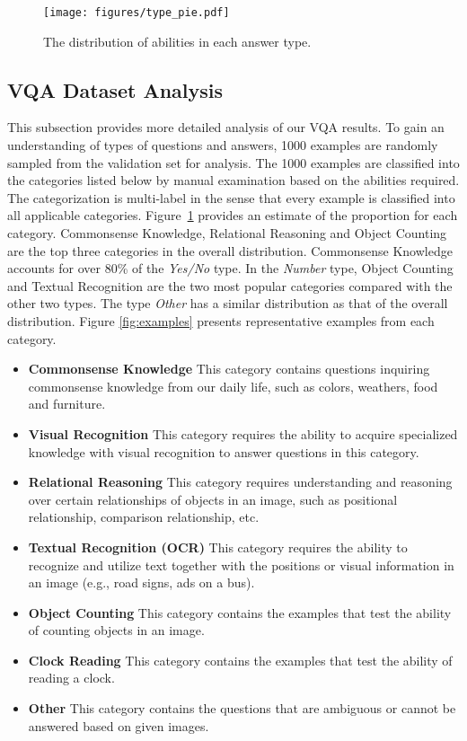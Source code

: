\begin{figure}[b]
\texttt{[image: figures/type\_pie.pdf]}
\caption{The distribution of abilities in each answer type.}
\label{fig:vqa_answertype}
\end{figure}

\subsection{VQA Dataset Analysis}

This subsection provides more detailed analysis of our VQA results. To gain an understanding of types of questions and answers, 1000 examples are randomly sampled from the validation set for analysis.
The 1000 examples are classified into the categories listed below by manual examination based on the abilities required. The categorization is multi-label in the sense that every example is classified into all applicable categories. Figure~\ref{fig:vqa_answertype} provides an estimate of the proportion for each category. Commonsense Knowledge, Relational Reasoning and Object Counting are the top three categories in the overall distribution. Commonsense Knowledge accounts for over 80\% of the \emph{Yes/No} type. In the \emph{Number} type, Object Counting and Textual Recognition are the two most popular categories compared with the other two types. The type \emph{Other} has a similar distribution as that of the overall distribution. Figure \ref{fig:examples} presents representative examples from each category.

\begin{itemize}
    \item \textbf{Commonsense Knowledge} This category contains questions inquiring commonsense knowledge from our daily life, such as colors, weathers, food and furniture.
    \item \textbf{Visual Recognition} This category requires the ability to acquire specialized knowledge with visual recognition to answer questions in this category.
    \item \textbf{Relational Reasoning} This category requires understanding and reasoning over certain relationships of objects in an image, such as positional relationship, comparison relationship, etc.    \item \textbf{Textual Recognition (OCR)} This category requires the ability to recognize and utilize text together with the positions or visual information in an image (e.g., road signs, ads on a bus).
    \item \textbf{Object Counting} This category contains the examples that test the ability of counting objects in an image.
    \item \textbf{Clock Reading} This category contains the examples that test the ability of reading a clock.
    \item \textbf{Other} This category contains the questions that are ambiguous or cannot be answered based on given images.
\end{itemize}


